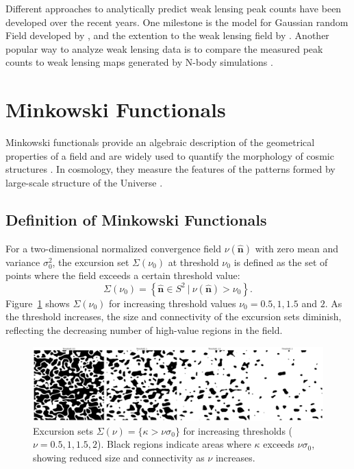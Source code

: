 Different approaches to analytically predict weak lensing peak counts have been developed over the recent years. One milestone is the model for Gaussian random Field developed by \citet{1986ApJ...304...15B}, and the extention to the weak lensing field by \citet{2010A&A...519A..23M}. Another popular way to analyze weak lensing data is to compare the measured peak counts to weak lensing maps generated by N-body simulations \citep{2010PhRvD..81h3505M, 2016MNRAS.463.3653K, 2018MNRAS.474..712M, 2021JCAP...01..028Z}.

\section{Minkowski Functionals}
\label{sec:minkowski_functionals}
Minkowski functionals provide an algebraic description of the geometrical properties of a field and are widely used to quantify the morphology of cosmic structures \citep{1994A&A...288..697M}. In cosmology,  they measure the features of the patterns formed by large-scale structure of the Universe \citep{1996dmu..conf..281S, 1997ApJ...482L...1S}.

\subsection{Definition of Minkowski Functionals}
For a two-dimensional normalized convergence field $\nu(\hat{\mathbf{n}})$ with zero mean and variance $\sigma_0^2$, the excursion set $\Sigma(\nu_0)$ at threshold $\nu_0$ is defined as the set of points where the field exceeds a certain threshold value:
\begin{equation}
    \Sigma(\nu_0) = \left\{ \hat{\mathbf{n}} \in S^2 \ \bigg| \ \nu(\hat{\mathbf{n}}) > \nu_0 \right\}.
\end{equation}
Figure~\ref{fig:excursion_sets} shows $\Sigma(\nu_0)$ for increasing threshold values $\nu_0 = 0.5, 1, 1.5$ and $2$. As the threshold increases, the size and connectivity of the excursion sets diminish, reflecting the decreasing number of high-value regions in the field.
\begin{figure}[ht]
    \centering
    \includegraphics[width=\textwidth]{figures/threshold_comparison.png}
    \caption[Excursion sets of different thresholds]{Excursion sets $\Sigma(\nu) = \{ \kappa > \nu \sigma_0 \}$ for increasing thresholds ($\nu = 0.5, 1, 1.5, 2$). Black regions indicate areas where $\kappa$ exceeds $\nu \sigma_0$, showing reduced size and connectivity as $\nu$ increases.}
    \label{fig:excursion_sets}
\end{figure}

